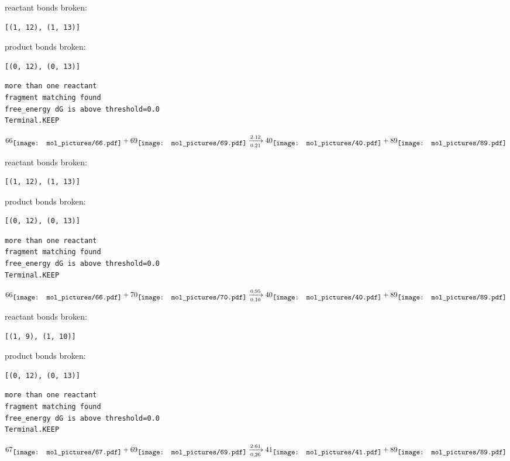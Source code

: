 \documentclass{article}
\begin{document}
reactant bonds broken:\begin{verbatim}
[(1, 12), (1, 13)]
\end{verbatim}
product bonds broken:\begin{verbatim}
[(0, 12), (0, 13)]
\end{verbatim}




\vspace{1cm}
\begin{verbatim}
more than one reactant
fragment matching found
free_energy dG is above threshold=0.0
Terminal.KEEP
\end{verbatim}
$$
66
\raisebox{-.5\height}{\texttt{[image: mol\_pictures/66.pdf]}}
+
69
\raisebox{-.5\height}{\texttt{[image: mol\_pictures/69.pdf]}}
\xrightarrow[0.21]{2.12}
40
\raisebox{-.5\height}{\texttt{[image: mol\_pictures/40.pdf]}}
+
89
\raisebox{-.5\height}{\texttt{[image: mol\_pictures/89.pdf]}}
$$


reactant bonds broken:\begin{verbatim}
[(1, 12), (1, 13)]
\end{verbatim}
product bonds broken:\begin{verbatim}
[(0, 12), (0, 13)]
\end{verbatim}




\vspace{1cm}
\begin{verbatim}
more than one reactant
fragment matching found
free_energy dG is above threshold=0.0
Terminal.KEEP
\end{verbatim}
$$
66
\raisebox{-.5\height}{\texttt{[image: mol\_pictures/66.pdf]}}
+
70
\raisebox{-.5\height}{\texttt{[image: mol\_pictures/70.pdf]}}
\xrightarrow[0.10]{0.95}
40
\raisebox{-.5\height}{\texttt{[image: mol\_pictures/40.pdf]}}
+
89
\raisebox{-.5\height}{\texttt{[image: mol\_pictures/89.pdf]}}
$$


reactant bonds broken:\begin{verbatim}
[(1, 9), (1, 10)]
\end{verbatim}
product bonds broken:\begin{verbatim}
[(0, 12), (0, 13)]
\end{verbatim}




\vspace{1cm}
\begin{verbatim}
more than one reactant
fragment matching found
free_energy dG is above threshold=0.0
Terminal.KEEP
\end{verbatim}
$$
67
\raisebox{-.5\height}{\texttt{[image: mol\_pictures/67.pdf]}}
+
69
\raisebox{-.5\height}{\texttt{[image: mol\_pictures/69.pdf]}}
\xrightarrow[0.26]{2.61}
41
\raisebox{-.5\height}{\texttt{[image: mol\_pictures/41.pdf]}}
+
89
\raisebox{-.5\height}{\texttt{[image: mol\_pictures/89.pdf]}}
$$
\end{document}
